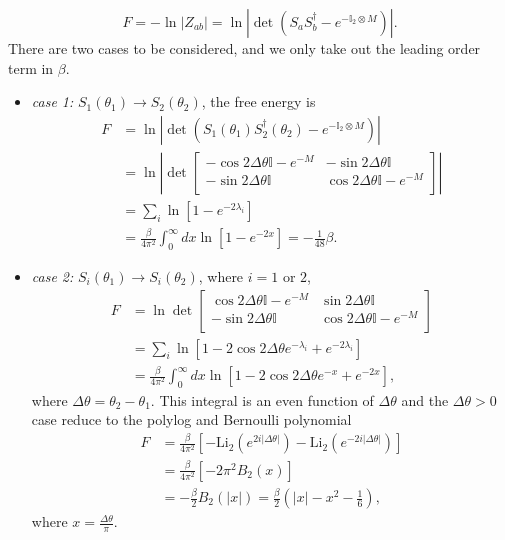 \begin{equation}
F = - \ln |Z_{ab}| = \ln |\det ( S_a S_b^{\dagger} - e^{- \mathbb{I}_2 \otimes M} )| .
\end{equation}
There are two cases to be considered, and we only take out the leading order term in $\beta$. 
\begin{itemize}
\item {\it case 1: }$S_1( \theta_1 ) \rightarrow S_2 ( \theta_2 ) $, the free energy is
\begin{equation}
\begin{aligned}
F & = \ln |\det ( S_1( \theta_1 )  S_2^{\dagger}( \theta_2 )  - e^{- \mathbb{I}_2 \otimes M} )| \\
  & = \ln \left| \det
\begin{bmatrix}
-\cos 2 \Delta \theta \mathbb{I} - e^{-M}   & -\sin 2 \Delta \theta \mathbb{I}\\
- \sin 2\Delta \theta \mathbb{I}  &   \cos 2 \Delta \theta \mathbb{I} - e^{-M} \\ 
\end{bmatrix} \right| \\
& = \sum_i \ln [ 1 -  e^{- 2 \lambda_i }  ] \\
& = \frac{\beta}{4\pi^2} \int_0^{\infty} dx \ln [ 1 - e^{-2x} ]  = - \frac{1}{48 }\beta .
\end{aligned}
\end{equation}
\item {\it case 2:} $S_i( \theta_1 ) \rightarrow S_i( \theta_2 )$, where $i = 1 $ or $ 2$, 
\begin{equation}
\begin{aligned}
F & = \ln \det 
\begin{bmatrix}
\cos 2 \Delta \theta \mathbb{I} - e^{-M}   & \sin 2 \Delta \theta \mathbb{I}\\
- \sin 2\Delta \theta \mathbb{I}  &   \cos 2 \Delta \theta \mathbb{I} - e^{-M} \\ 
\end{bmatrix} \\
& = \sum_i \ln [ 1 - 2 \cos 2 \Delta \theta e^{- \lambda_i } + e^{- 2 \lambda_i }  ] \\
& = \frac{\beta}{4\pi^2} \int_0^{\infty} dx \ln [ 1 - 2 \cos 2 \Delta \theta e^{-x} + e^{-2x} ] ,
\end{aligned}
\end{equation}
where $\Delta \theta = \theta_2 - \theta_1$. This integral is an even function of $\Delta \theta$ and the $\Delta \theta > 0$ case reduce to the polylog and Bernoulli polynomial
\begin{equation}
\begin{aligned}
  F &= \frac{\beta}{4\pi^2} \left[ - \text{Li}_2 ( e^{2i |\Delta \theta|} ) - \text{Li}_2 ( e^{- 2i |\Delta \theta|} ) \right] \\
  & = \frac{\beta}{4\pi^2}  \left[ - 2\pi^2 B_2 (x) \right] \\
  &= - \frac{\beta}{2} B_2( |x| )  = \frac{\beta}{2} (| x| - x^2 - \frac{1}{6} ),
\end{aligned}
\end{equation}
where $x = \frac{\Delta \theta}{ \pi}$. 
\end{itemize}





